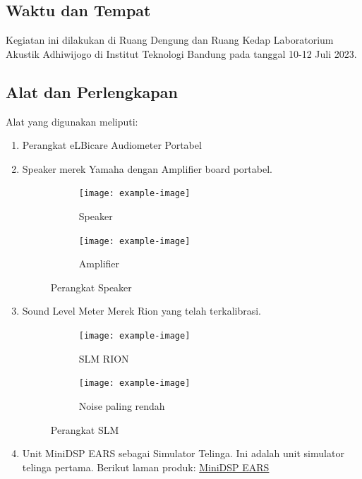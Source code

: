\documentclass{article}
\begin{document}
	\subsection{Waktu dan Tempat}

	Kegiatan ini dilakukan di Ruang Dengung dan Ruang Kedap Laboratorium Akustik Adhiwijogo di Institut Teknologi Bandung pada tanggal 10-12 Juli 2023.

	\subsection{Alat dan Perlengkapan}

	Alat yang digunakan meliputi:
	
	\begin{enumerate}
		\item Perangkat eLBicare Audiometer Portabel
		
		
		
		\item Speaker merek Yamaha dengan Amplifier board portabel.

		\begin{figure}[H]
			\centering
			\begin{subfigure}[]{.45\textwidth}
				\texttt{[image: example-image]}
				\caption{Speaker}
			\end{subfigure}
			\begin{subfigure}[]{.45\textwidth}
				\texttt{[image: example-image]}
				\caption{Amplifier}
			\end{subfigure}
			\caption{Perangkat Speaker}
		\end{figure}

		\item Sound Level Meter Merek Rion yang telah terkalibrasi.

		\begin{figure}[H]
			\centering
			\begin{subfigure}[]{.35\textwidth}
				\texttt{[image: example-image]}
				\caption{SLM RION}
			\end{subfigure}
			\begin{subfigure}[]{.25\textwidth}
				\texttt{[image: example-image]}
				\caption{Noise paling rendah}
			\end{subfigure}
			\caption{Perangkat SLM}
		\end{figure}

		\item Unit MiniDSP EARS sebagai Simulator Telinga. Ini adalah unit simulator telinga pertama.
		Berikut laman produk: \href{https://www.minidsp.com/products/acoustic-measurement/ears-headphone-jig}{MiniDSP EARS}


\end{enumerate}
\end{document}
